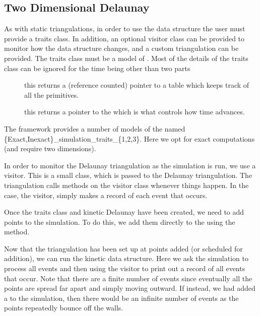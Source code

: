 

\subsection{Two Dimensional Delaunay}
\label{sec:delaunay_2_example}

As with static triangulations, in order to use the data structure the
user must provide a traits class. In addition, an optional visitor
class can be provided to monitor how the data structure changes, and a
custom triangulation can be provided. The traits class must be a model
of . Most of the details of the traits class can
be ignored for the time being other than two parts 
\begin{description}
\item[] this returns a (reference counted) pointer to a table which keeps track of all the primitives.
\item[] this returns a pointer to the  which is what controls how time advances.
\end{description}
The framework provides a number of models of the
 named
\{Exact,Inexact\}\_simulation\_traits\_\{1,2,3\}. Here we opt for
exact computations (and require two dimensions).

In order to monitor the Delaunay triangulation as the simulation is
run, we use a visitor. This is a small class, which is passed to the
Delaunay triangulation. The triangulation calls methods on the visitor
class whenever things happen. In the case, the visitor,
 simply makes a record of each event that occurs.

Once the traits class and kinetic Delaunay have been created, we need
to add points to the simulation. To do this, we add them directly to
the
 using the  method. 


Now that the triangulation has been set up at points added (or
scheduled for addition), we can run the kinetic data structure. Here
we ask the simulation to process all events and then using the visitor
to print out a record of all events that occur. Note that there are a
finite number of events since eventually all the points are spread far
apart and simply moving outward. If instead, we had added a
 to the simulation, then 
there would be an infinite number of events as the points repeatedly
bounce off the walls.

